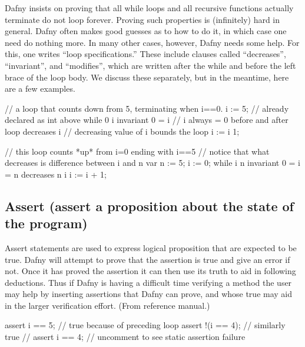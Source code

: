 \documentclass[letterpaper,10pt,english]{sphinxmanual}
\begin{document}
Dafny insists on proving that all while loops and all recursive
functions actually terminate \textendash{} do not loop forever. Proving such
properties is (infinitely) hard in general. Dafny often makes good
guesses as to how to do it, in which case one need do nothing more. In
many other cases, however, Dafny needs some help. For this, one writes
“loop specifications.” These include clauses called “decreases”,
“invariant”, and “modifies”, which are written after the while and
before the left brace of the loop body. We discuss these separately,
but in the meantime, here are a few examples.

\begin{sphinxVerbatim}[commandchars=\\\{\}]
// a loop that counts down from 5, terminating when i==0.
i := 5;                 // already declared as int above
while 0 \PYGZlt{} i
    invariant 0 \PYGZlt{}= i    // i always \PYGZgt{}= 0 before and after loop
    decreases i         // decreasing value of i bounds the loop
\PYGZob{}
    i := i \PYGZhy{} 1;
\PYGZcb{}

// this loop counts *up* from i=0 ending with i==5
// notice that what decreases is difference between i and n
var n := 5;
i := 0;
while i \PYGZlt{} n
    invariant 0 \PYGZlt{}= i \PYGZlt{}= n
    decreases n \PYGZhy{} i
\PYGZob{}
    i := i + 1;
\PYGZcb{}
\end{sphinxVerbatim}


\subsection{Assert (assert a proposition about the state of the program)}
\label{\detokenize{06-dafny-language:assert-assert-a-proposition-about-the-state-of-the-program}}
Assert statements are used to express logical proposition that are
expected to be true. Dafny will attempt to prove that the assertion is
true and give an error if not. Once it has proved the assertion it can
then use its truth to aid in following deductions. Thus if Dafny is
having a difficult time verifying a method the user may help by
inserting assertions that Dafny can prove, and whose true may aid in
the larger verification effort.  (From reference manual.)

\begin{sphinxVerbatim}[commandchars=\\\{\}]
assert i == 5;      // true because of preceding loop
assert !(i == 4);   // similarly true
// assert i == 4;   // uncomment to see static assertion failure
\end{sphinxVerbatim}
\end{document}
